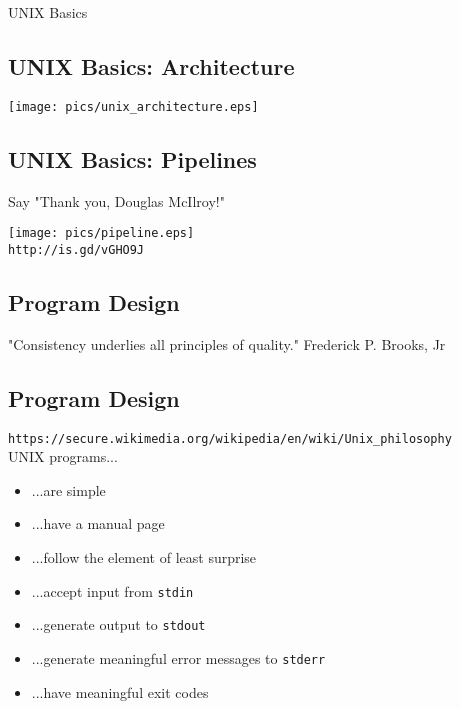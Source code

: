 \documentclass[xga]{xdvislides}
\begin{document}
\pagebreak

\vspace*{\fill}
\begin{center}
  \Hugesize
    UNIX Basics
	\hspace*{5mm}\blueline\\ [1em]
  \Normalsize
\end{center}
\vspace*{\fill}

\subsection{UNIX Basics: Architecture}
\begin{center}
\texttt{[image: pics/unix\_architecture.eps]}
\end{center}

\subsection{UNIX Basics: Pipelines}
Say "Thank you, Douglas McIlroy!"
\begin{center}
\texttt{[image: pics/pipeline.eps]} \\
\verb+http://is.gd/vGHO9J+ \\
\end{center}

\subsection{Program Design}
\vspace*{\fill}
\Huge
\begin{center}
"Consistency underlies all principles of quality." Frederick P. Brooks, Jr
\end{center}
\Normalsize
\vspace*{\fill}


\subsection{Program Design}
\verb+https://secure.wikimedia.org/wikipedia/en/wiki/Unix_philosophy+ \\

UNIX programs...
\begin{itemize}
	\item ...are simple
	\item ...have a manual page
	\item ...follow the element of least surprise
	\item ...accept input from {\tt stdin}
	\item ...generate output to {\tt stdout}
	\item ...generate meaningful error messages to {\tt stderr}
	\item ...have meaningful exit codes
\end{itemize}
\end{document}
